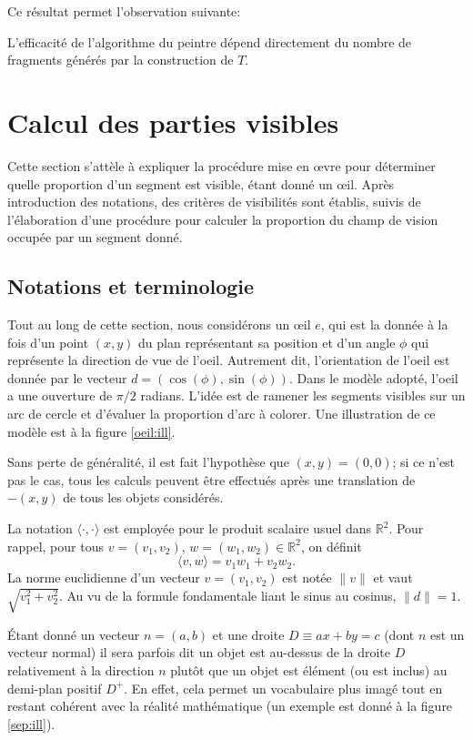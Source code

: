 Ce résultat permet l'observation suivante:
\begin{cor}
  L'efficacité de l'algorithme du peintre dépend directement
  du nombre de fragments générés par la construction de $T$.
\end{cor}
\section{Calcul des parties visibles}
Cette section s'attèle à expliquer la procédure mise en \oe{}vre pour déterminer
quelle proportion d'un segment est visible, étant donné un \oe{}il.
Après introduction des notations, des critères de visibilités sont
établis, suivis de l'élaboration d'une procédure pour calculer la
proportion du champ de vision occupée par un segment donné.

\subsection{Notations et terminologie}
Tout au long de cette section, nous considérons un \oe{}il $e$, qui est la donnée à
la fois d'un point $(x, y)$ du plan représentant sa position et d'un angle $\phi$
qui représente la direction de vue de l'oeil. Autrement dit, l'orientation de
l'oeil est donnée par le vecteur $d=(\cos(\phi), \sin(\phi))$. Dans le modèle
adopté, l'oeil a une ouverture de $\pi/2$ radians. L'idée est de ramener
les segments visibles sur un arc de cercle et d'évaluer la proportion d'arc
à colorer. Une illustration de ce modèle est à la figure \ref{oeil:ill}.



Sans perte de généralité, il est fait l'hypothèse que $(x, y) = (0, 0)$;
si ce n'est pas le cas, tous les
calculs peuvent être effectués après une translation de $-(x, y)$ de tous
les objets considérés.

La notation $\langle \cdot,\cdot\rangle$ est employée pour le produit scalaire usuel
dans $\mathbb R^2$. Pour rappel, pour tous $v=(v_1, v_2)$,
$w=(w_1, w_2)\in\mathbb R^2$, on définit
$$\langle v, w\rangle = v_1 w_1 + v_2 w_2.$$
La norme euclidienne d'un vecteur $v = (v_1, v_2)$ est notée
$\|v\|$ et vaut $\sqrt{v_1^2 + v_2^2}$. Au vu de la formule fondamentale liant le
sinus au cosinus, $\|d\| = 1$.

\'Etant  donné un vecteur $n = (a, b)$ et une droite $D\equiv ax+by=c$
(dont $n$ est un vecteur normal) il sera parfois dit
\og un objet est au-dessus de la droite $D$ relativement à la direction $n$\fg{}
plutôt que \og{}un objet est élément (ou est inclus) au demi-plan positif $D^+$\fg{}.
En effet, cela permet un vocabulaire plus imagé tout en restant cohérent
avec la réalité mathématique (un exemple est donné à la figure \ref{sep:ill}).

